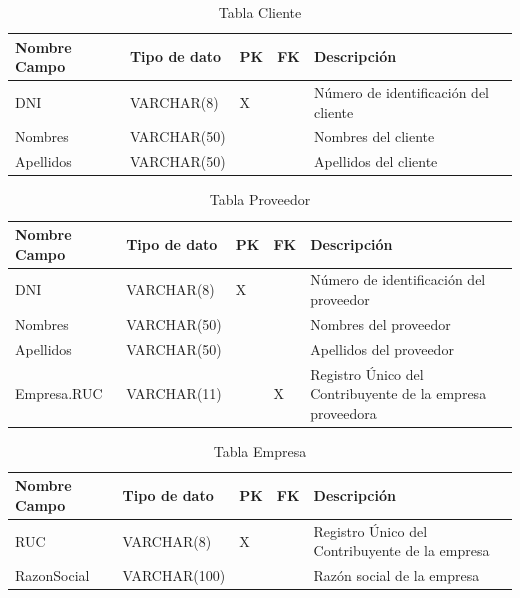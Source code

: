 \documentclass[12pt]{article}
\begin{document}
\begin{table}[htbp]
    \begin{center}
        \begin{tabular}{|p{3cm}|p{3cm}|p{1cm}|p{1cm}|p{6cm}|}
            \hline
            Nombre Campo & Tipo de dato & PK & FK & Descripción \\
            \hline
            DNI & VARCHAR(8) & X &  & Número de identificación del cliente \\
            Nombres & VARCHAR(50) &  &  & Nombres del cliente \\
            Apellidos & VARCHAR(50) &  &  & Apellidos del cliente \\
            \hline
            \end{tabular}
        \caption{Tabla Cliente}
        \label{tab:tablas}
    \end{center}
\end{table}


\begin{table}[htbp]
    \begin{center}
        \begin{tabular}{|p{3cm}|p{3cm}|p{1cm}|p{1cm}|p{6cm}|}
            \hline
            Nombre Campo & Tipo de dato & PK & FK & Descripción \\
            \hline
            DNI & VARCHAR(8) & X &  & Número de identificación del proveedor \\
            Nombres & VARCHAR(50) &  &  & Nombres del proveedor \\
            Apellidos & VARCHAR(50) &  &  & Apellidos del proveedor \\
            Empresa.RUC & VARCHAR(11) &  & X & Registro Único del Contribuyente de la empresa proveedora \\
            \hline
            \end{tabular}
        \caption{Tabla Proveedor}
        \label{tab:tablas}
    \end{center}
\end{table}


\begin{table}[htbp]
    \begin{center}
        \begin{tabular}{|p{3cm}|p{3cm}|p{1cm}|p{1cm}|p{6cm}|}
            \hline
            Nombre Campo & Tipo de dato & PK & FK & Descripción \\
            \hline
            RUC & VARCHAR(8) & X &  & Registro Único del Contribuyente de la empresa \\
            RazonSocial & VARCHAR(100) &  &  & Razón social de la empresa \\
            \hline
            \end{tabular}
        \caption{Tabla Empresa}
        \label{tab:tablas}
    \end{center}
\end{table}
\end{document}
